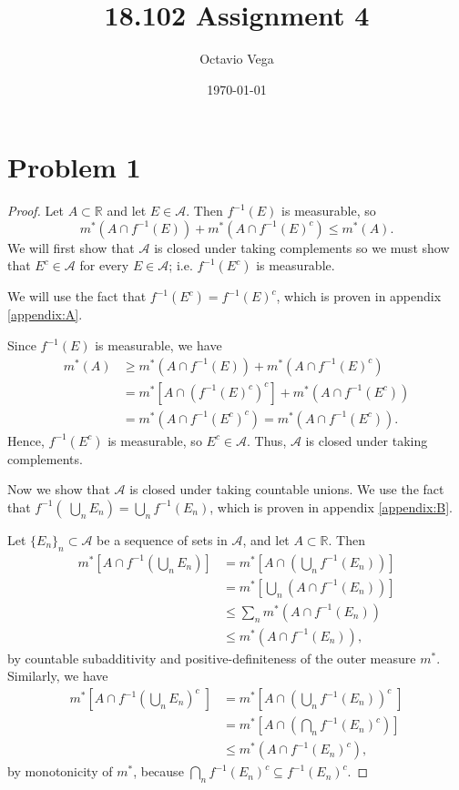 \documentclass{article}
\title{18.102 Assignment 4}
\author{Octavio Vega}
\date\today
\begin{document}
\maketitle
	
\section*{Problem 1}
\begin{proof}
	Let $A \subset \mathbb{R}$ and let $E \in \mathcal{A}$. Then $f^{-1}(E)$ is measurable, so
	\begin{equation}
		m^*\left(A\cap f^{-1}(E)\right) + m^*\left(A\cap f^{-1}(E)^c\right) \leq m^*(A).
	\end{equation}
	We will first show that $\mathcal{A}$ is closed under taking complements so we must show that $E^c \in \mathcal{A}$ for every $E \in \mathcal{A}$; i.e. $f^{-1}(E^c)$ is measurable. 
	
	We will use the fact that $f^{-1}(E^c) = f^{-1}(E)^c$, which is proven in appendix \ref{appendix:A}.
	
	Since $f^{-1}(E)$ is measurable, we have
	\begin{align}
		m^*(A) &\geq m^*\left(A\cap f^{-1}(E)\right) + m^*\left(A\cap f^{-1}(E)^c\right) \\
		&= m^*\left[A\cap\left(f^{-1}(E)^c\right)^c\right] + m^*\left(A\cap f^{-1}(E^c)\right) \\
		&= m^*\left(A\cap f^{-1}(E^c)^c\right) = m^*\left(A\cap f^{-1}(E^c)\right).
	\end{align}
	Hence, $f^{-1}(E^c)$ is measurable, so $E^c \in \mathcal{A}$. Thus, $\mathcal{A}$ is closed under taking complements.
	
	Now we show that $\mathcal{A}$ is closed under taking countable unions. We use the fact that $f^{-1}\left( \; \bigcup_n E_n\right) = \bigcup_n f^{-1}(E_n)$, which is proven in appendix \ref{appendix:B}.
	
	Let $\{E_n\}_n \subset \mathcal{A}$ be a sequence of sets in $\mathcal{A}$, and let $A\subset \mathbb{R}$. Then 
	\begin{align}
		m^*\left[A\cap f^{-1}\left(\bigcup_n E_n\right)\right] &= m^*\left[A\cap\left(\bigcup_n f^{-1}(E_n)\right)\right] \\
		&= m^*\left[\bigcup_n\left(A\cap f^{-1}(E_n)\right)\right] \\
		& \leq \sum_n m^*\left(A\cap f^{-1}(E_n)\right) \\
		& \leq m^*\left(A\cap f^{-1}(E_n)\right),
	\end{align}
	by countable subadditivity and positive-definiteness of the outer measure $m^*$. Similarly, we have
	\begin{align}
		m^*\left[A\cap f^{-1}\left(\bigcup_n E_n\right)^c \; \right] &= m^*\left[A\cap \left(\bigcup_n f^{-1}(E_n)\right)^c \; \right] \\
		&= m^*\left[A\cap\left(\bigcap_n f^{-1}(E_n)^c\right)\right] \\
		&\leq m^*\left(A\cap f^{-1}(E_n)^c\right),
	\end{align}
	by monotonicity of $m^*$, because $\bigcap_n f^{-1}(E_n)^c \subseteq f^{-1}(E_n)^c$.
	

\end{proof}
\end{document}
